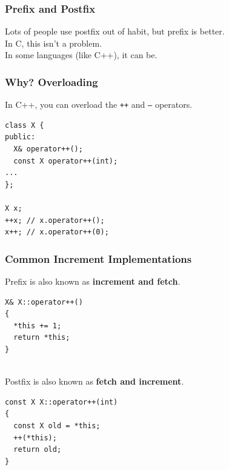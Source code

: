 

\begin{frame}
  \frametitle{Prefix and Postfix}

  

  Lots of people use postfix out of habit, but prefix is better.\\[2em]

  In C, this isn't a problem. \\[1em]
  In some languages (like C++), it can be.
  
\end{frame}

\begin{frame}[fragile]
  \frametitle{Why? Overloading}

  

  In C++, you can overload the {\tt ++} and {\tt --} operators.

  \begin{lstlisting}
class X {
public:
  X& operator++();
  const X operator++(int);
...
};

X x;
++x; // x.operator++();
x++; // x.operator++(0);
  \end{lstlisting}
  
\end{frame}

\begin{frame}[fragile]
  \frametitle{Common Increment Implementations}

  

  Prefix is also known as {\bf increment and fetch}.

  \begin{lstlisting}
X& X::operator++()
{
  *this += 1;
  return *this;
}
  \end{lstlisting}
~\\[1em]

  Postfix is also known as {\bf fetch and increment}.

  \begin{lstlisting}
const X X::operator++(int)
{
  const X old = *this;
  ++(*this);
  return old;
}
  \end{lstlisting}
  
\end{frame}

